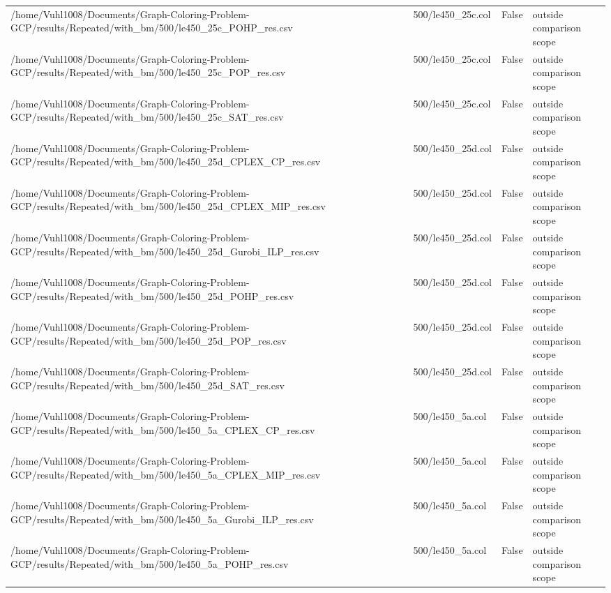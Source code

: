 \begin{table}[htbp]
\begin{tabular}{llll}
/home/Vuhl1008/Documents/Graph-Coloring-Problem-GCP/results/Repeated/with\_bm/500/le450\_25c\_POHP\_res.csv & 500/le450\_25c.col & False & outside comparison scope \\
/home/Vuhl1008/Documents/Graph-Coloring-Problem-GCP/results/Repeated/with\_bm/500/le450\_25c\_POP\_res.csv & 500/le450\_25c.col & False & outside comparison scope \\
/home/Vuhl1008/Documents/Graph-Coloring-Problem-GCP/results/Repeated/with\_bm/500/le450\_25c\_SAT\_res.csv & 500/le450\_25c.col & False & outside comparison scope \\
/home/Vuhl1008/Documents/Graph-Coloring-Problem-GCP/results/Repeated/with\_bm/500/le450\_25d\_CPLEX\_CP\_res.csv & 500/le450\_25d.col & False & outside comparison scope \\
/home/Vuhl1008/Documents/Graph-Coloring-Problem-GCP/results/Repeated/with\_bm/500/le450\_25d\_CPLEX\_MIP\_res.csv & 500/le450\_25d.col & False & outside comparison scope \\
/home/Vuhl1008/Documents/Graph-Coloring-Problem-GCP/results/Repeated/with\_bm/500/le450\_25d\_Gurobi\_ILP\_res.csv & 500/le450\_25d.col & False & outside comparison scope \\
/home/Vuhl1008/Documents/Graph-Coloring-Problem-GCP/results/Repeated/with\_bm/500/le450\_25d\_POHP\_res.csv & 500/le450\_25d.col & False & outside comparison scope \\
/home/Vuhl1008/Documents/Graph-Coloring-Problem-GCP/results/Repeated/with\_bm/500/le450\_25d\_POP\_res.csv & 500/le450\_25d.col & False & outside comparison scope \\
/home/Vuhl1008/Documents/Graph-Coloring-Problem-GCP/results/Repeated/with\_bm/500/le450\_25d\_SAT\_res.csv & 500/le450\_25d.col & False & outside comparison scope \\
/home/Vuhl1008/Documents/Graph-Coloring-Problem-GCP/results/Repeated/with\_bm/500/le450\_5a\_CPLEX\_CP\_res.csv & 500/le450\_5a.col & False & outside comparison scope \\
/home/Vuhl1008/Documents/Graph-Coloring-Problem-GCP/results/Repeated/with\_bm/500/le450\_5a\_CPLEX\_MIP\_res.csv & 500/le450\_5a.col & False & outside comparison scope \\
/home/Vuhl1008/Documents/Graph-Coloring-Problem-GCP/results/Repeated/with\_bm/500/le450\_5a\_Gurobi\_ILP\_res.csv & 500/le450\_5a.col & False & outside comparison scope \\
/home/Vuhl1008/Documents/Graph-Coloring-Problem-GCP/results/Repeated/with\_bm/500/le450\_5a\_POHP\_res.csv & 500/le450\_5a.col & False & outside comparison scope \\

\end{tabular}
\end{table}
